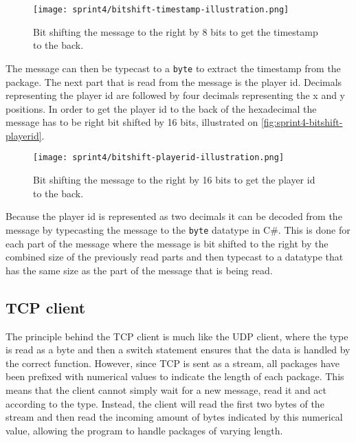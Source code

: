 \begin{figure}[H]
    \centering
    \texttt{[image: sprint4/bitshift-timestamp-illustration.png]}
    \caption{Bit shifting the message to the right by 8 bits to get the timestamp to the back.}
    \label{fig:sprint4-bitshift-timestamp}
\end{figure}
\noindent
The message can then be typecast to a \texttt{byte} to extract the timestamp from the package.
The next part that is read from the message is the player id.
Decimals representing the player id are followed by four decimals representing the x and y positions.
In order to get the player id to the back of the hexadecimal the message has to be right bit shifted by 16 bits, illustrated on \autoref{fig:sprint4-bitshift-playerid}.
\begin{figure}[H]
    \centering
    \texttt{[image: sprint4/bitshift-playerid-illustration.png]}
    \caption{Bit shifting the message to the right by 16 bits to get the player id to the back.}
    \label{fig:sprint4-bitshift-playerid}
\end{figure}
\noindent
Because the player id is represented as two decimals it can be decoded from the message by typecasting the message to the \texttt{byte} datatype in C\#.
This is done for each part of the message where the message is bit shifted to the right by the combined size of the previously read parts and then typecast to a datatype that has the same size as the part of the message that is being read.
\subsection*{TCP client}
The principle behind the TCP client is much like the UDP client, where the type is read as a byte and then a switch statement ensures that the data is handled by the correct function.
However, since TCP is sent as a stream, all packages have been prefixed with numerical values to indicate the length of each package.
This means that the client cannot simply wait for a new message, read it and act according to the type.
Instead, the client will read the first two bytes of the stream and then read the incoming amount of bytes indicated by this numerical value, allowing the program to handle packages of varying length.
